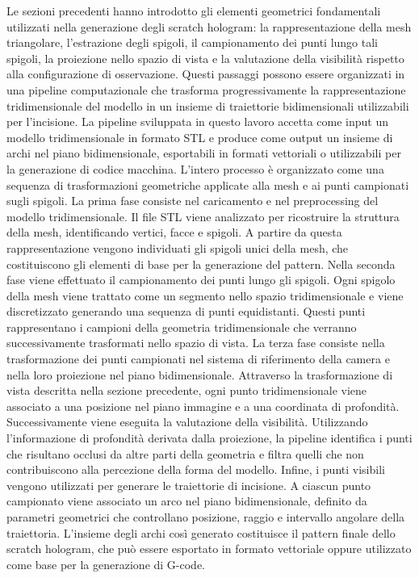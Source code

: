 \documentclass[a4paper,11pt,titlepage,twoside]{book}
\newcommand{\1}{\mathbf{1}}
\numberwithin{equation}{chapter}
\theoremstyle{plain}
\theoremstyle{definition}
\begin{document}
	Le sezioni precedenti hanno introdotto gli elementi geometrici fondamentali utilizzati nella generazione degli scratch hologram: la rappresentazione della mesh triangolare, l’estrazione degli spigoli, il campionamento dei punti lungo tali spigoli, la proiezione nello spazio di vista e la valutazione della visibilità rispetto alla configurazione di osservazione. Questi passaggi possono essere organizzati in una pipeline computazionale che trasforma progressivamente la rappresentazione tridimensionale del modello in un insieme di traiettorie bidimensionali utilizzabili per l’incisione.
	La pipeline sviluppata in questo lavoro accetta come input un modello tridimensionale in formato STL e produce come output un insieme di archi nel piano bidimensionale, esportabili in formati vettoriali o utilizzabili per la generazione di codice macchina. L’intero processo è organizzato come una sequenza di trasformazioni geometriche applicate alla mesh e ai punti campionati sugli spigoli.
	La prima fase consiste nel caricamento e nel preprocessing del modello tridimensionale. Il file STL viene analizzato per ricostruire la struttura della mesh, identificando vertici, facce e spigoli. A partire da questa rappresentazione vengono individuati gli spigoli unici della mesh, che costituiscono gli elementi di base per la generazione del pattern.
	Nella seconda fase viene effettuato il campionamento dei punti lungo gli spigoli. Ogni spigolo della mesh viene trattato come un segmento nello spazio tridimensionale e viene discretizzato generando una sequenza di punti equidistanti. Questi punti rappresentano i campioni della geometria tridimensionale che verranno successivamente trasformati nello spazio di vista.
	La terza fase consiste nella trasformazione dei punti campionati nel sistema di riferimento della camera e nella loro proiezione nel piano bidimensionale. Attraverso la trasformazione di vista descritta nella sezione precedente, ogni punto tridimensionale viene associato a una posizione nel piano immagine e a una coordinata di profondità.
	Successivamente viene eseguita la valutazione della visibilità. Utilizzando l’informazione di profondità derivata dalla proiezione, la pipeline identifica i punti che risultano occlusi da altre parti della geometria e filtra quelli che non contribuiscono alla percezione della forma del modello.
	Infine, i punti visibili vengono utilizzati per generare le traiettorie di incisione. A ciascun punto campionato viene associato un arco nel piano bidimensionale, definito da parametri geometrici che controllano posizione, raggio e intervallo angolare della traiettoria. L’insieme degli archi così generato costituisce il pattern finale dello scratch hologram, che può essere esportato in formato vettoriale oppure utilizzato come base per la generazione di G-code.
	
\end{document}
